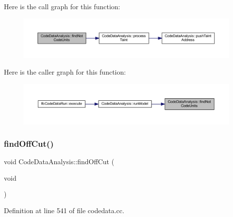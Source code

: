 Here is the call graph for this function\+:
\nopagebreak
\begin{figure}[H]
\begin{center}
\leavevmode
\includegraphics[width=350pt]{class_code_data_analysis_ae2dec2b15124c18ebc197f1e21efe357_cgraph}
\end{center}
\end{figure}
Here is the caller graph for this function\+:
\nopagebreak
\begin{figure}[H]
\begin{center}
\leavevmode
\includegraphics[width=350pt]{class_code_data_analysis_ae2dec2b15124c18ebc197f1e21efe357_icgraph}
\end{center}
\end{figure}
\mbox{\label{class_code_data_analysis_ad069e36b39959763921b330663387d3c}} 
\subsubsection{\texorpdfstring{findOffCut()}{findOffCut()}}
{\footnotesize\ttfamily void Code\+Data\+Analysis\+::find\+Off\+Cut (\begin{DoxyParamCaption}\item[{void}]{ }\end{DoxyParamCaption})}



Definition at line 541 of file codedata.\+cc.

